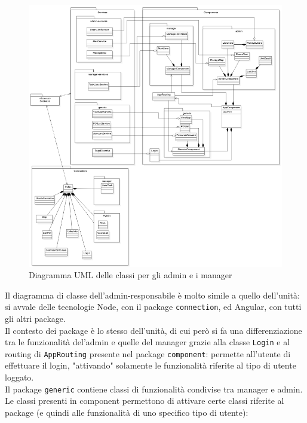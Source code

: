 \begin{figure}[H]
	\centering
	\includegraphics[scale=0.6]{res/images/UML_admin-manager.png}
	\caption{Diagramma UML delle classi per gli admin e i manager}
\end{figure}
Il diagramma di classe dell'admin-responsabile è molto simile a quello dell'unità: si avvale delle tecnologie Node, con il package \texttt{connection}, ed Angular, con tutti gli altri package.\\
Il contesto dei package è lo stesso dell'unità, di cui però si fa una differenziazione tra le funzionalità del'admin e quelle del manager grazie alla classe \texttt{Login} e al routing di \texttt{AppRouting} presente nel package \texttt{component}: permette all'utente di effettuare il login, "attivando" solamente le funzionalità riferite al tipo di utente loggato.\\
Il package \texttt{generic} contiene classi di funzionalità condivise tra manager e admin.\\
Le classi presenti in component permettono di attivare certe classi riferite al package (e quindi alle funzionalità di uno specifico tipo di utente):
